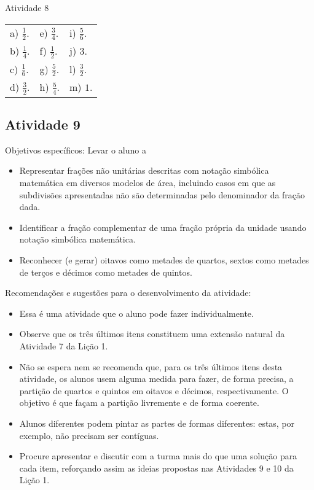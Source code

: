 \documentclass[oneside]{book}
\begin{document}
\begin{multicols}{2}
\begin{resposta*}{Atividade 8}
\begin{tabular}{m{}m{}m{}}
    a) $\frac{1}{2}$. & e) $\frac{3}{4}$. &  i) $\frac{5}{6}$.\\
    b) $\frac{1}{4}$. & f) $\frac{1}{2}$. &  j) $3$.\\
    c) $\frac{1}{6}$. & g) $\frac{5}{2}$. &  l) $\frac{3}{2}$.\\
    d) $\frac{3}{2}$. & h) $\frac{5}{4}$. &  m) $1$.
\end{tabular} %

\end{resposta*}




\subsection{Atividade 9}



  Objetivos específicos: Levar o aluno a
\begin{itemize} %
    \item       Representar frações não unitárias descritas com notação simbólica matemática em diversos modelos de área, incluindo casos em que as subdivisões apresentadas não são determinadas pelo denominador da fração dada.
    \item       Identificar a fração complementar de uma fração própria da unidade usando notação simbólica matemática.
    \item       Reconhecer (e gerar) oitavos como metades de quartos, sextos como metades de terços e décimos como metades de quintos.
\end{itemize} %


  Recomendações e sugestões para o desenvolvimento da atividade:
\begin{itemize} %
    \item       Essa é uma atividade que o aluno pode fazer individualmente.
    \item       Observe que os três últimos itens constituem uma extensão natural da Atividade 7 da Lição 1.
    \item       Não se espera nem se recomenda que, para os três últimos itens desta atividade, os alunos usem alguma medida para fazer, de forma precisa, a partição de quartos e quintos em oitavos e décimos, respectivamente. O objetivo é que façam a partição livremente e de forma coerente.
    \item       Alunos diferentes podem pintar as partes de formas diferentes: estas, por exemplo, não precisam ser contíguas.
    \item       Procure apresentar e discutir com a turma mais do que uma solução para cada item, reforçando assim as ideias propostas nas Atividades 9 e 10 da Lição 1.
\end{itemize} %



\end{multicols}
\end{document}
